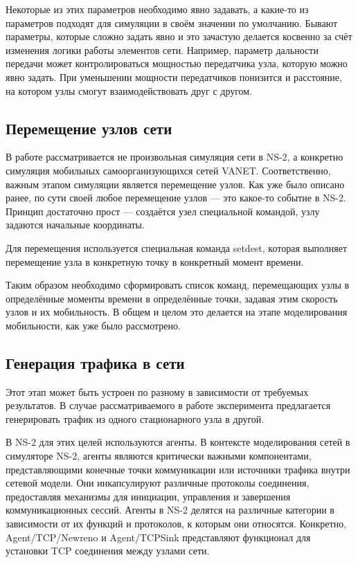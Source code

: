 Некоторые из этих параметров необходимо явно задавать, а какие-то из параметров подходят для симуляции в своём значении по умолчанию. Бывают параметры, которые сложно задать явно и это зачастую делается косвенно за счёт изменения логики работы элементов сети. Например, параметр дальности передачи может контролироваться мощностью передатчика узла, которую можно явно задать. При уменьшении мощности передатчиков понизится и расстояние, на котором узлы смогут взаимодействовать друг с другом.

\subsection{Перемещение узлов сети}

В работе рассматривается не произвольная симуляция сети в NS-2, а конкретно симуляция мобильных самоорганизующихся сетей VANET. Соответственно, важным этапом симуляции является перемещение узлов. Как уже было описано ранее, по сути своей любое перемещение узлов --- это какое-то событие в NS-2. Принцип достаточно прост --- создаётся узел специальной командой, узлу задаются начальные координаты.

Для перемещения используется специальная команда setdest, которая выполняет перемещение узла в конкретную точку в конкретный момент времени.

Таким образом необходимо сформировать список команд, перемещающих узлы в определённые моменты времени в определённые точки, задавая этим скорость узлов и их мобильность. В общем и целом это делается на этапе моделирования мобильности, как уже было рассмотрено.

\subsection{Генерация трафика в сети}

Этот этап может быть устроен по разному в зависимости от требуемых результатов. В случае рассматриваемого в работе эксперимента предлагается генерировать трафик из одного стационарного узла в другой.

В NS-2 для этих целей используются агенты. В контексте моделирования сетей в симуляторе NS-2, агенты являются критически важными компонентами, представляющими конечные точки коммуникации или источники трафика внутри сетевой модели. Они инкапсулируют различные протоколы соединения, предоставляя механизмы для инициации, управления и завершения коммуникационных сессий. Агенты в NS-2 делятся на различные категории в зависимости от их функций и протоколов, к которым они относятся. Конкретно, Agent/TCP/Newreno и Agent/TCPSink представляют функционал для установки TCP соединения между узлами сети.

